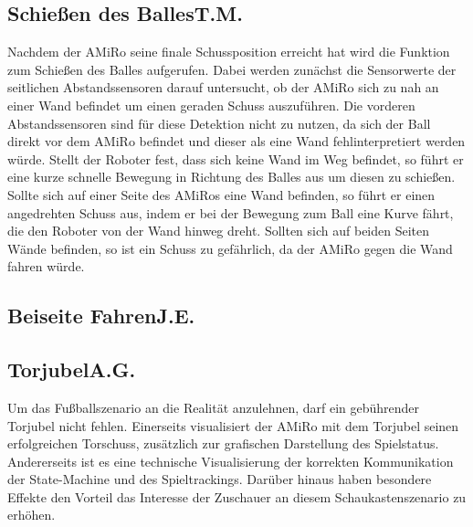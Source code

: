 \subsection[Schießen des Balles]{Schießen des Balles\hfill {\normalsize T.M.}} %

Nachdem der AMiRo seine finale Schussposition erreicht hat wird die Funktion zum Schießen des Balles aufgerufen. Dabei werden zunächst die Sensorwerte der seitlichen Abstandssensoren darauf untersucht, ob der AMiRo sich zu nah an einer Wand befindet um einen geraden Schuss auszuführen. Die vorderen Abstandssensoren sind für diese Detektion nicht zu nutzen, da sich der Ball direkt vor dem AMiRo befindet und dieser als eine Wand fehlinterpretiert werden würde. 
Stellt der Roboter fest, dass sich keine Wand im Weg befindet, so führt er eine kurze schnelle Bewegung in Richtung des Balles aus um diesen zu schießen.
Sollte sich auf einer Seite des AMiRos eine Wand befinden, so führt er einen angedrehten Schuss aus, indem er bei der Bewegung zum Ball eine Kurve fährt, die den Roboter von der Wand hinweg dreht. 
Sollten sich auf beiden Seiten Wände befinden, so ist ein Schuss zu gefährlich, da der AMiRo gegen die Wand fahren würde.


\subsection[Beiseite Fahren]{Beiseite Fahren\hfill {\normalsize J.E.}} %

\subsection[Torjubel]{Torjubel\hfill {\normalsize A.G.}} %
Um das Fußballszenario an die Realität anzulehnen, darf ein gebührender Torjubel nicht fehlen. Einerseits visualisiert der AMiRo mit dem Torjubel seinen erfolgreichen Torschuss, zusätzlich zur grafischen Darstellung des Spielstatus. Andererseits ist es eine technische Visualisierung der korrekten Kommunikation der State-Machine und des Spieltrackings. Darüber hinaus haben besondere Effekte den Vorteil das Interesse der Zuschauer an diesem Schaukastenszenario zu erhöhen.

